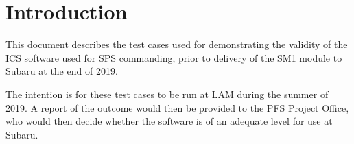 \section{Introduction}

This document describes the test cases used for demonstrating the
validity of the \acrshort{ICS} software used for SPS commanding, prior
to delivery of the SM1 module to Subaru at the end of 2019.

The intention is for these test cases to be run at \acrshort{LAM} during
the summer of 2019. A report of the outcome would then be provided to
the \acrshort{PFS} Project Office, who would then decide whether the
software is of an adequate level for use at Subaru. 
    